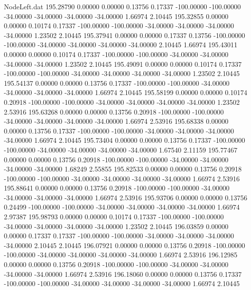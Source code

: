 \begin{filecontents}{NodeLeft.dat}
 195.28790    0.00000    0.00000     0.13756    0.17337 -100.00000 -100.00000  -34.00000  -34.00000  -34.00000  -34.00000    1.66974    2.10445
 195.32855    0.00000    0.00000     0.10174    0.17337 -100.00000 -100.00000  -34.00000  -34.00000  -34.00000  -34.00000    1.23502    2.10445
 195.37941    0.00000    0.00000     0.17337    0.13756 -100.00000 -100.00000  -34.00000  -34.00000  -34.00000  -34.00000    2.10445    1.66974
 195.43011    0.00000    0.00000     0.10174    0.17337 -100.00000 -100.00000  -34.00000  -34.00000  -34.00000  -34.00000    1.23502    2.10445
 195.49091    0.00000    0.00000     0.10174    0.17337 -100.00000 -100.00000  -34.00000  -34.00000  -34.00000  -34.00000    1.23502    2.10445
 195.54137    0.00000    0.00000     0.13756    0.17337 -100.00000 -100.00000  -34.00000  -34.00000  -34.00000  -34.00000    1.66974    2.10445
 195.58199    0.00000    0.00000     0.10174    0.20918 -100.00000 -100.00000  -34.00000  -34.00000  -34.00000  -34.00000    1.23502    2.53916
 195.63268    0.00000    0.00000     0.13756    0.20918 -100.00000 -100.00000  -34.00000  -34.00000  -34.00000  -34.00000    1.66974    2.53916
 195.68338    0.00000    0.00000     0.13756    0.17337 -100.00000 -100.00000  -34.00000  -34.00000  -34.00000  -34.00000    1.66974    2.10445
 195.73404    0.00000    0.00000     0.13756    0.17337 -100.00000 -100.00000  -34.00000  -34.00000  -34.00000  -34.00000    1.67540    2.11159
 195.77467    0.00000    0.00000     0.13756    0.20918 -100.00000 -100.00000  -34.00000  -34.00000  -34.00000  -34.00000    1.68249    2.55855
 195.82533    0.00000    0.00000     0.13756    0.20918 -100.00000 -100.00000  -34.00000  -34.00000  -34.00000  -34.00000    1.66974    2.53916
 195.88641    0.00000    0.00000     0.13756    0.20918 -100.00000 -100.00000  -34.00000  -34.00000  -34.00000  -34.00000    1.66974    2.53916
 195.93706    0.00000    0.00000     0.13756    0.24499 -100.00000 -100.00000  -34.00000  -34.00000  -34.00000  -34.00000    1.66974    2.97387
 195.98793    0.00000    0.00000     0.10174    0.17337 -100.00000 -100.00000  -34.00000  -34.00000  -34.00000  -34.00000    1.23502    2.10445
 196.03859    0.00000    0.00000     0.17337    0.17337 -100.00000 -100.00000  -34.00000  -34.00000  -34.00000  -34.00000    2.10445    2.10445
 196.07921    0.00000    0.00000     0.13756    0.20918 -100.00000 -100.00000  -34.00000  -34.00000  -34.00000  -34.00000    1.66974    2.53916
 196.12985    0.00000    0.00000     0.13756    0.20918 -100.00000 -100.00000  -34.00000  -34.00000  -34.00000  -34.00000    1.66974    2.53916
 196.18060    0.00000    0.00000     0.13756    0.17337 -100.00000 -100.00000  -34.00000  -34.00000  -34.00000  -34.00000    1.66974    2.10445

\end{filecontents}
